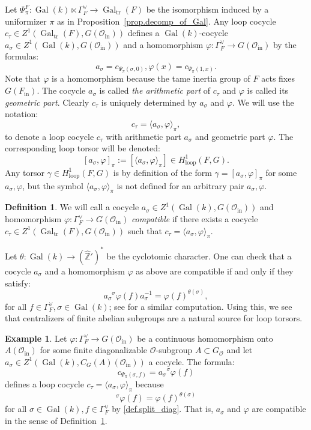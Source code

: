 \documentclass[12pt]{amsart}
\numberwithin{equation}{section}
\theoremstyle{definition}
\newtheorem{example}[theorem]{Example}
\newtheorem{definition}[theorem]{Definition}
\newcommand{\cO}{\mathcal{O}}
\newcommand{\bZ}{\mathbb{Z}}
\newcommand{\Gal}{\operatorname{Gal}}
\newcommand{\tr}{\operatorname{tr}}
\newcommand{\oin}{\operatorname{in}}
\newcommand{\Oin}{\cO_{\oin}}
\newcommand{\Fin}{F_{\oin}}
\newcommand{\vphi}{\varphi}
\newcommand{\Galtr}{\Gal_{\tr}}
\newcommand{\I}[1]{\Gamma_{#1}^{\vee}}
\newcommand{\lop}{\operatorname{loop}}
\begin{document}
Let $\Psi^F_\pi : \Gal(k)\ltimes \I{F} \to \Galtr(F)$ be the isomorphism induced by a uniformizer $\pi$ as in Proposition~\ref{prop.decomp_of_Gal}.
Any loop cocycle $c_\tau \in Z^1(\Galtr(F),G(\Oin))$ defines a $\Gal(k)$-cocycle $a_\sigma\in Z^1(\Gal(k),G(\Oin))$ and a homomorphism $\vphi: \I{F} \to G(\Oin)$ by the formulas:
$$a_\sigma = c_{\Psi_\pi(\sigma,0)}, \vphi(x) = c_{\Psi_\pi(1,x)}.$$
Note that $\vphi$ is a homomorphism because the tame inertia group of $F$ acts fixes $G(\Fin)$. The cocycle $a_\sigma$ is called \emph{the arithmetic part} of $c_\tau$ and $\vphi$ is called its \emph{geometric part}. Clearly $c_\tau$ is uniquely determined by $a_\sigma$ and $\vphi$. We will use the notation:
$$c_\tau = \langle a_\sigma,\vphi\rangle_\pi,$$
to denote a loop cocycle $c_\tau$ with arithmetic part $a_\sigma$ and geometric part $\vphi$. The corresponding loop torsor will be denoted:
$$[a_\sigma, \vphi]_\pi := [\langle a_\sigma,\vphi\rangle_\pi] \in H^1_{\lop}(F,G).$$
Any torsor $\gamma\in H^1_{\lop}(F,G)$ is by definition of the form $\gamma=[a_\sigma,\vphi]_\pi$ for some $a_\sigma,\vphi$, but the symbol $\langle a_\sigma,\vphi\rangle_\pi$ is not defined for an arbitrary pair $a_\sigma,\vphi$.
\begin{definition}\label{def.compatible}
We will call a cocycle $a_\sigma \in Z^1(\Gal(k),G(\Oin))$ and homomorphism $\vphi: \I{F}\to G(\Oin)$ \emph{compatible} if there exists a cocycle $c_\tau\in Z^1(\Galtr(F),G(\Oin))$ such that $c_\tau = \langle a_\sigma, \vphi\rangle_\pi$.
\end{definition}
Let $\theta: \Gal(k)\to (\hat{\bZ}')^*$ be the cyclotomic character. One can check that a cocycle $a_\sigma$ and a homomorphism $\vphi$ as above are compatible if and only if they satisfy:
\begin{equation}\label{e.compatibility}
    a_\sigma {}^\sigma \vphi(f) a_{\sigma}^{-1} = \vphi(f)^{\theta(\sigma)},
\end{equation}
for all $f\in \I{F},\sigma\in \Gal(k)$; see \cite[Lemma 3.7]{gille2013torsors} for a similar computation. Using this, we see that centralizers of finite abelian subgroups are a natural source for loop torsors.
\begin{example}\label{ex.main}
    Let $\vphi: \I{F} \to G(\Oin)$ be a continuous homomorphism onto $A(\Oin)$ for some finite diagonalizable $\cO$-subgroup $A\subset G_{\cO}$ and let $a_\sigma \in Z^1(\Gal(k),C_G(A)(\Oin))$ a cocycle. The formula:
    $$c_{\Psi_\pi(\sigma,f)} = a_\sigma {}^{\sigma} \vphi(f)$$
    defines a loop cocycle $c_\tau = \langle a_\sigma,\vphi\rangle_\pi$ because $${}^{\sigma}\vphi(f) = \vphi(f)^{\theta(\sigma)}$$ for all $\sigma\in \Gal(k), f\in \I{F}$ by \eqref{def.split_diag}. That is, $a_\sigma$ and $\vphi$ are compatible in the sense of Definition~\ref{def.compatible}.
\end{example}
\end{document}
